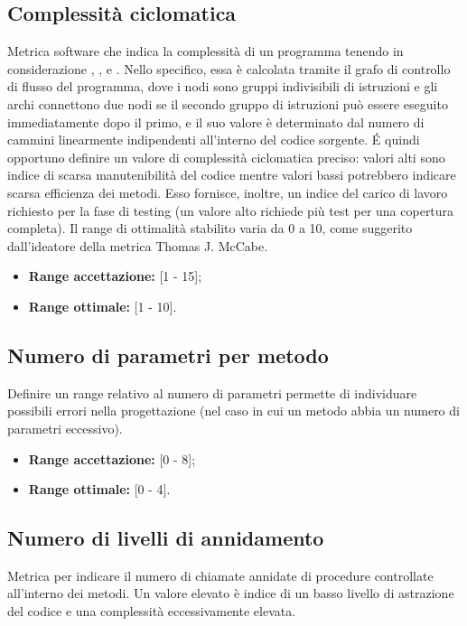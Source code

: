 \subsection{Complessità ciclomatica}
Metrica software che indica la complessità di un programma tenendo in considerazione , ,  e .
Nello specifico, essa è calcolata tramite il grafo di controllo di flusso del programma, dove i nodi sono gruppi indivisibili di istruzioni e gli archi connettono due nodi se il secondo gruppo di istruzioni può essere eseguito immediatamente dopo il primo, e il suo valore è determinato dal numero di cammini linearmente indipendenti all'interno del codice sorgente. 
\'E quindi opportuno definire un valore di complessità ciclomatica preciso: valori alti sono indice di scarsa manutenibilità del codice mentre valori bassi potrebbero indicare scarsa efficienza dei metodi.
Esso fornisce, inoltre, un indice del carico di lavoro richiesto per la fase di testing (un valore alto richiede più test per una copertura completa).
Il range di ottimalità stabilito varia da 0 a 10, come suggerito dall'ideatore della metrica Thomas J. McCabe.  

\begin{itemize}
	\item \textbf{Range accettazione:} [1 - 15];
	\item \textbf{Range ottimale:} [1 - 10].
\end{itemize}

\subsection{Numero di parametri per metodo}
Definire un range relativo al numero di parametri permette di individuare possibili errori nella progettazione (nel caso in cui un metodo abbia un numero di parametri eccessivo).
 
\begin{itemize}
	\item \textbf{Range accettazione:} [0 - 8];
	\item \textbf{Range ottimale:} [0 - 4].
\end{itemize}  


\subsection{Numero di livelli di annidamento}
Metrica per indicare il numero di chiamate annidate di procedure controllate all'interno dei metodi.\newline
Un valore elevato è indice di un basso livello di astrazione del codice e una complessità eccessivamente elevata. 

